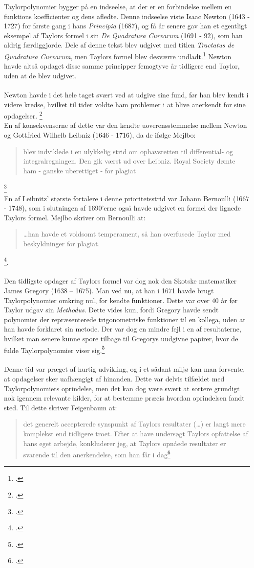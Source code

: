 \documentclass[12pt, a4paper]{article}
\begin{document}
\begin{refsection}
Taylorpolynomier bygger på en indseelse, at der er en forbindelse mellem en funktions koefficienter og dens afledte. Denne indseelse viste Isaac Newton (1643 - 1727) for første gang i hans \textit{Principia} (1687), og få år senere gav han et egentligt eksempel af Taylors formel i sin \textit{De Quadratura Curvarum} (1691 - 92), som han aldrig færdiggjorde. Dele af denne tekst blev udgivet med titlen \textit{Tractatus de Quadratura Curvarum}, men Taylors formel blev desværre undladt.\footcite[s. 248]{roy_2021} Newton havde altså opdaget disse samme principper femogtyve år tidligere end Taylor, uden at de blev udgivet.\\
\\
Newton havde i det hele taget svært ved at udgive sine fund, før han blev kendt i videre kredse, hvilket til tider voldte ham problemer i at blive anerkendt for sine opdagelser. \footcite[s. 116]{uendeligerækker}\\
En af konsekvenserne af dette var den kendte uoverensstemmelse mellem Newton og Gottfried Wilhelb Leibniz (1646 - 1716), da de ifølge Mejlbo:
\blockquote{blev indviklede i en ulykkelig strid om ophavsretten til differential- og integralregningen. Den gik værst  ud over Leibniz. Royal Society dømte ham - ganske uberettiget - for plagiat}.\footcite[s. 103]{uendeligerækker}\\
En af Leibnitz' største fortalere i denne prioritetsstrid var Johann Bernoulli (1667 - 1748), som i slutningen af 1690'erne også havde udgivet en formel der lignede Taylors formel. Mejlbo skriver om Bernoulli at: \blockquote{\dots han havde et voldsomt temperament, så han overfusede Taylor med beskyldninger for plagiat.}\footcite[s. 111]{uendeligerækker}.\\
\\
Den tidligste opdager af Taylors formel var dog nok den Skotske matematiker James Gregory (1638 – 1675). Man ved nu, at han i 1671 havde brugt Taylorpolynomier omkring nul, for kendte funktioner. Dette var over 40 år før Taylor udgav sin \textit{Methodus}. Dette vides kun, fordi Gregory havde sendt polynomier der repræsenterede trigonometriske funktioner til en kollega, uden at han havde forklaret sin metode. Der var dog en mindre fejl i en af resultaterne, hvilket man senere kunne spore tilbage til Gregorys uudgivne papirer, hvor de fulde Taylorpolynomier viser sig.\footcite[s. 113-118]{alma99122953280205763}\\
\\
Denne tid var præget af hurtig udvikling, og i et sådant miljø kan man forvente, at opdagelser sker uafhængigt af hinanden. Dette var delvis tilfældet med Taylorpolynomiets oprindelse, men det kan dog være svært at sortere grundigt nok igennem relevante kilder, for at bestemme præcis hvordan oprindelsen fandt sted. Til dette skriver Feigenbaum at: \blockquote{det generelt accepterede synspunkt af Taylors resultater (\dots) er langt mere komplekst end tidligere troet. Efter at have undersøgt Taylors opfattelse af hans eget arbejde, konkluderer jeg, at Taylors opnåede resultater er svarende til den anerkendelse, som han får i dag\footcite[s. 96]{feigenbaum_exact_sciences}}

\end{refsection}
\end{document}
